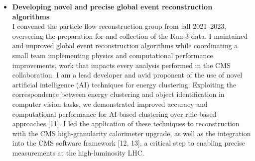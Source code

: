 \documentclass[10pt]{res} %
\begin{document}
\begin{resume}
\begin{itemize}
  \item\textbf{Developing novel and precise global event reconstruction algorithms} \\
    I convened the particle flow reconstruction group from fall 2021--2023, overseeing the preparation for and collection of the Run 3 data.
    I maintained and improved global event reconstruction algorithms while coordinating a small team implementing physics 
    and computational performance improvements, work that impacts every analysis performed in the CMS collaboration. 
    I am a lead developer and avid proponent of 
    the use of novel artificial intelligence (AI) techniques for energy clustering. Exploiting the correspondence
    between energy clustering and object identification in computer vision tasks, we demonstrated improved accuracy and computational 
    performance for AI-based clustering over rule-based approaches [11]. I led the application
    of these techniques to reconstruction with the CMS high-granularity calorimeter upgrade,
    as well as the integration into the CMS software framework [12, 13], a critical step to enabling
    precise measurements at the high-luminosity LHC.

\end{itemize}


\end{resume}
\end{document}
